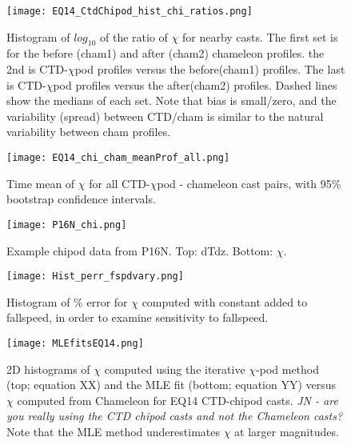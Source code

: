 \documentclass{ametsoc}
\begin{document}
\begin{figure}[t]
  \noindent\texttt{[image: EQ14\_CtdChipod\_hist\_chi\_ratios.png]}\\
  \caption{Histogram of $log_{10}$ of the ratio of $\chi$ for nearby casts. The first set is for the before (cham1) and after (cham2) chameleon profiles. the 2nd is CTD-$\chi$pod profiles versus the before(cham1) profiles. The last is CTD-$\chi$pod profiles versus the after(cham2) profiles. Dashed lines show the medians of each set.  Note that bias is small/zero, and the variability (spread) between CTD/cham is similar to the natural variability between cham profiles.}
  \label{eq14_cdtChi_vs_cham_hist}
\end{figure}

\begin{figure}[t]
  \noindent\texttt{[image: EQ14\_chi\_cham\_meanProf\_all.png]}\\
  \caption{Time mean of $\chi$ for all CTD-$\chi$pod - chameleon cast pairs, with 95\% bootstrap confidence intervals.}
  \label{ctd_cham_chi_boot_all}
\end{figure}

\begin{figure}[t]
 \noindent\texttt{[image: P16N\_chi.png]}\\
 \caption{Example chipod data from P16N. Top: dTdz. Bottom: $\chi$.}
 \label{p16ex}
\end{figure}

\begin{figure}[t]
  \noindent\texttt{[image: Hist\_perr\_fspdvary.png]}\\
  \caption{Histogram of \% error for $\chi$ computed with constant added to fallspeed, in order to examine sensitivity to fallspeed.}
  \label{FspdSensHist}
\end{figure}


\begin{figure}[t]
  \noindent\texttt{[image: MLEfitsEQ14.png]}\\
  \caption{2D histograms of $\chi$ computed using the iterative $\chi$-pod method (top; equation XX) and the MLE fit (bottom; equation YY) versus $\chi$ computed from Chameleon for EQ14 CTD-chipod casts. {\em JN - are you really using the CTD chipod casts and not the Chameleon casts?} Note that the MLE method underestimates $\chi$ at larger magnitudes.}
  \label{mlefits}
\end{figure}
\end{document}
